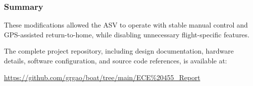 \subsubsection*{Summary}

These modifications allowed the ASV to operate with stable manual control and GPS-assisted return-to-home, while disabling unnecessary flight-specific features.

\bigskip

The complete project repository, including design documentation, hardware details, software configuration, and source code references, is available at:

\begin{center}
\url{https://github.com/grgao/boat/tree/main/ECE%20455_Report}
\end{center}